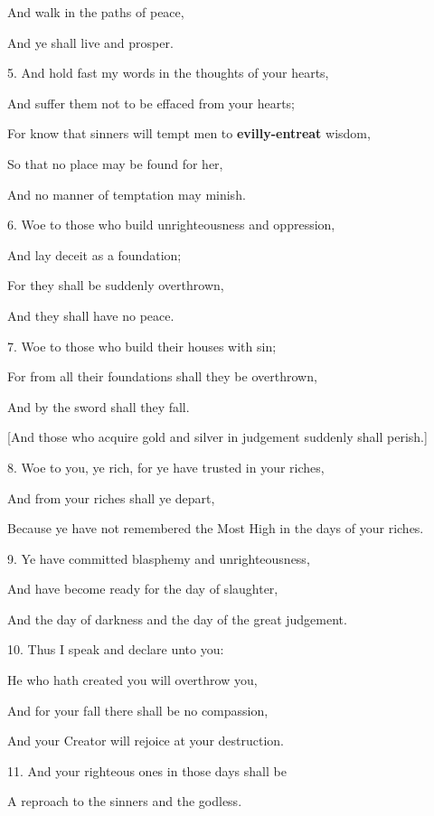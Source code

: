 And walk in the paths of peace,

And ye shall live and prosper.

5. And hold fast my words in the thoughts of your hearts,

And suffer them not to be effaced from your hearts;

For know that sinners will tempt men to \textbf{evilly-entreat} wisdom,

So that no place may be found for her,

And no manner of temptation may minish.


6. Woe to those who build unrighteousness and oppression,

And lay deceit as a foundation;

For they shall be suddenly overthrown,

And they shall have no peace.

7. Woe to those who build their houses with sin;

For from all their foundations shall they be overthrown,

And by the sword shall they fall.

[And those who acquire gold and silver in judgement suddenly shall perish.]

8. Woe to you, ye rich, for ye have trusted in your riches,

And from your riches shall ye depart,

Because ye have not remembered the Most High in the days of your riches.

9. Ye have committed blasphemy and unrighteousness,

And have become ready for the day of slaughter,

And the day of darkness and the day of the great judgement.

10. Thus I speak and declare unto you:

He who hath created you will overthrow you,

And for your fall there shall be no compassion,

And your Creator will rejoice at your destruction.

11. And your righteous ones in those days shall be

A reproach to the sinners and the godless.


